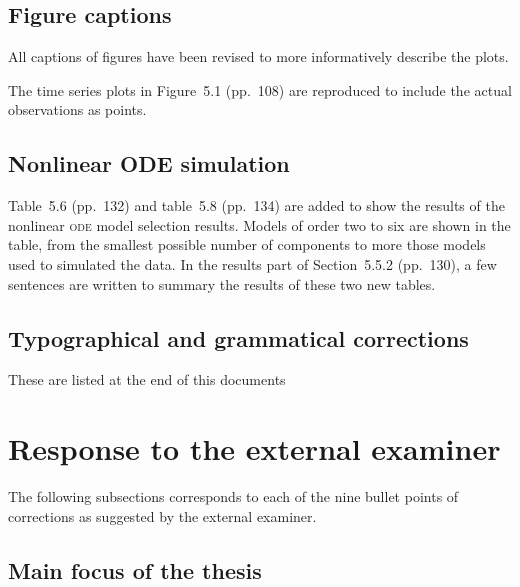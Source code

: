 \documentclass[11pt, fontset=Scala]{marticle}
\begin{document}
\subsection{Figure captions} %
\label{sub:figure_captions_point_2_}

All captions of figures have been revised to more informatively describe the plots.

The time series plots in Figure~5.1 (pp.~108) are reproduced to include the actual observations as points.


\subsection{Nonlinear ODE simulation} %
\label{sub:nonlinear_ode_simulation}

Table~5.6 (pp.~132) and table~5.8 (pp.~134) are added to show the results of the nonlinear \textsc{ode} model selection results. Models of order two to six are shown in the table, from the smallest possible number of components to more those models used to simulated the data. In the results part of Section~5.5.2 (pp.~130), a few sentences are written to summary the results of these two new tables.


\subsection{Typographical and grammatical corrections} %
\label{sub:typographical_and_grammatical_corrections}

These are listed at the end of this documents



\section{Response to the external examiner} %
\label{sec:response_to_the_external_examiner}

The following subsections corresponds to each of the nine bullet points of corrections as suggested by the external examiner.

\subsection{Main focus of the thesis} %
\label{sub:main_focus_of_the_thesis_point_1_}
\end{document}

